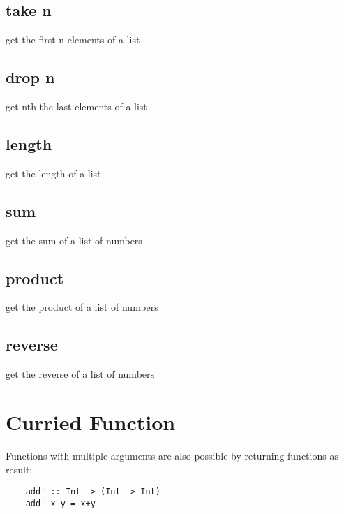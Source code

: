 \documentclass[a4paper,12pt]{article}
\theoremstyle{definition}
\begin{document}
\subsection{take n} get the first n elements of a list 

\subsection{drop n} get nth the last elements of a list 

\subsection{length} get the length of a list 

\subsection{sum} get the sum of a list of numbers

\subsection{product} get the product of a list of numbers

\subsection{reverse} get the reverse of a list of numbers

\section{Curried Function} Functions with multiple arguments are also possible by returning functions as result:
  \begin{lstlisting}
    add' :: Int -> (Int -> Int)
    add' x y = x+y
  \end{lstlisting}
\end{document}
